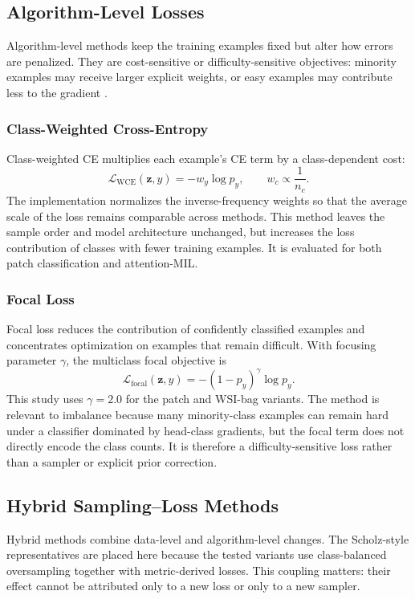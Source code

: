 \documentclass[11pt]{article}
\begin{document}
\subsection{Algorithm-Level Losses}
Algorithm-level methods keep the training examples fixed but alter how errors are penalized. They are cost-sensitive or difficulty-sensitive objectives: minority examples may receive larger explicit weights, or easy examples may contribute less to the gradient \citep{saini2023tacklingClass,scholz2024imbalanceAware}.

\subsubsection{Class-Weighted Cross-Entropy}
Class-weighted CE multiplies each example's CE term by a class-dependent cost:
\begin{equation}
  \mathcal{L}_{\mathrm{WCE}}(\mathbf{z},y) = -w_y\log p_y,
  \qquad
  w_c \propto \frac{1}{n_c}.
  \label{eq:weighted-ce}
\end{equation}
The implementation normalizes the inverse-frequency weights so that the average scale of the loss remains comparable across methods. This method leaves the sample order and model architecture unchanged, but increases the loss contribution of classes with fewer training examples. It is evaluated for both patch classification and attention-MIL.

\subsubsection{Focal Loss}
Focal loss reduces the contribution of confidently classified examples and concentrates optimization on examples that remain difficult. With focusing parameter $\gamma$, the multiclass focal objective is
\begin{equation}
  \mathcal{L}_{\mathrm{focal}}(\mathbf{z},y) =
  -(1-p_y)^{\gamma}\log p_y.
  \label{eq:focal}
\end{equation}
This study uses $\gamma=2.0$ for the patch and WSI-bag variants. The method is relevant to imbalance because many minority-class examples can remain hard under a classifier dominated by head-class gradients, but the focal term does not directly encode the class counts. It is therefore a difficulty-sensitive loss rather than a sampler or explicit prior correction.

\subsection{Hybrid Sampling--Loss Methods}
Hybrid methods combine data-level and algorithm-level changes. The Scholz-style representatives are placed here because the tested variants use class-balanced oversampling together with metric-derived losses. This coupling matters: their effect cannot be attributed only to a new loss or only to a new sampler.
\end{document}

